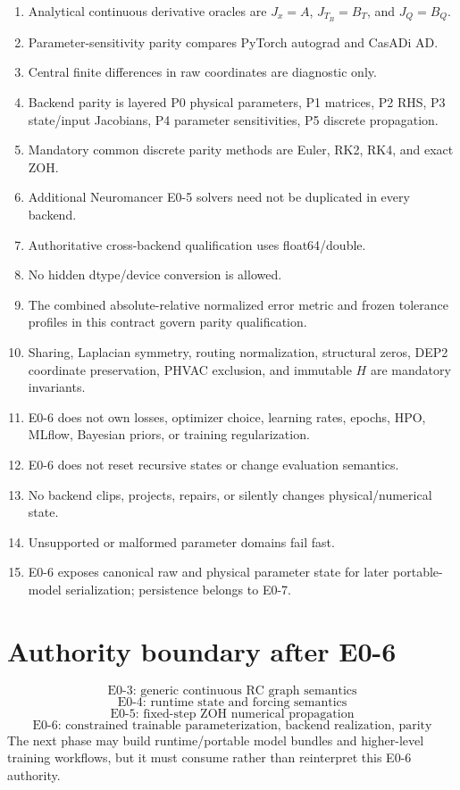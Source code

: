 \documentclass[11pt]{article}
\begin{document}
\begin{enumerate}[leftmargin=*]
\item Analytical continuous derivative oracles are $J_x=A$, $J_{T_B}=B_T$, and $J_Q=B_Q$.
\item Parameter-sensitivity parity compares PyTorch autograd and CasADi AD.
\item Central finite differences in raw coordinates are diagnostic only.
\item Backend parity is layered P0 physical parameters, P1 matrices, P2 RHS, P3 state/input Jacobians, P4 parameter sensitivities, P5 discrete propagation.
\item Mandatory common discrete parity methods are Euler, RK2, RK4, and exact ZOH.
\item Additional Neuromancer E0-5 solvers need not be duplicated in every backend.
\item Authoritative cross-backend qualification uses float64/double.
\item No hidden dtype/device conversion is allowed.
\item The combined absolute-relative normalized error metric and frozen tolerance profiles in this contract govern parity qualification.
\item Sharing, Laplacian symmetry, routing normalization, structural zeros, DEP2 coordinate preservation, PHVAC exclusion, and immutable $H$ are mandatory invariants.
\item E0-6 does not own losses, optimizer choice, learning rates, epochs, HPO, MLflow, Bayesian priors, or training regularization.
\item E0-6 does not reset recursive states or change evaluation semantics.
\item No backend clips, projects, repairs, or silently changes physical/numerical state.
\item Unsupported or malformed parameter domains fail fast.
\item E0-6 exposes canonical raw and physical parameter state for later portable-model serialization; persistence belongs to E0-7.
\end{enumerate}

\section{Authority boundary after E0-6}
\[
\boxed{\text{E0-3: generic continuous RC graph semantics}}
\]
\[
\boxed{\text{E0-4: runtime state and forcing semantics}}
\]
\[
\boxed{\text{E0-5: fixed-step ZOH numerical propagation}}
\]
\[
\boxed{\text{E0-6: constrained trainable parameterization, backend realization, parity}}
\]
The next phase may build runtime/portable model bundles and higher-level training
workflows, but it must consume rather than reinterpret this E0-6 authority.



\end{document}
